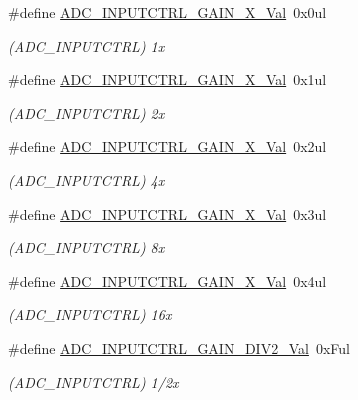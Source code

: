 \begin{DoxyCompactItemize}
\item 
\#define \mbox{\hyperlink{group___s_a_m_d21___a_d_c_gae498c391fa8ac63d38569d002826605a}{A\+D\+C\+\_\+\+I\+N\+P\+U\+T\+C\+T\+R\+L\+\_\+\+G\+A\+I\+N\+\_\+X\+\_\+\+Val}}~0x0ul
\begin{DoxyCompactList}\small\item\em (A\+D\+C\+\_\+\+I\+N\+P\+U\+T\+C\+T\+RL) 1x \end{DoxyCompactList}\item 
\#define \mbox{\hyperlink{group___s_a_m_d21___a_d_c_gacc42108cc0e40f605bd1b3454c9508d4}{A\+D\+C\+\_\+\+I\+N\+P\+U\+T\+C\+T\+R\+L\+\_\+\+G\+A\+I\+N\+\_\+X\+\_\+\+Val}}~0x1ul
\begin{DoxyCompactList}\small\item\em (A\+D\+C\+\_\+\+I\+N\+P\+U\+T\+C\+T\+RL) 2x \end{DoxyCompactList}\item 
\#define \mbox{\hyperlink{group___s_a_m_d21___a_d_c_ga1f880c59128e102862d2e5d67a354be2}{A\+D\+C\+\_\+\+I\+N\+P\+U\+T\+C\+T\+R\+L\+\_\+\+G\+A\+I\+N\+\_\+X\+\_\+\+Val}}~0x2ul
\begin{DoxyCompactList}\small\item\em (A\+D\+C\+\_\+\+I\+N\+P\+U\+T\+C\+T\+RL) 4x \end{DoxyCompactList}\item 
\#define \mbox{\hyperlink{group___s_a_m_d21___a_d_c_ga947e4391fff8d438b3388a77858ad0ad}{A\+D\+C\+\_\+\+I\+N\+P\+U\+T\+C\+T\+R\+L\+\_\+\+G\+A\+I\+N\+\_\+X\+\_\+\+Val}}~0x3ul
\begin{DoxyCompactList}\small\item\em (A\+D\+C\+\_\+\+I\+N\+P\+U\+T\+C\+T\+RL) 8x \end{DoxyCompactList}\item 
\#define \mbox{\hyperlink{group___s_a_m_d21___a_d_c_gac1ed865d00b174a99fe28a0697de2dff}{A\+D\+C\+\_\+\+I\+N\+P\+U\+T\+C\+T\+R\+L\+\_\+\+G\+A\+I\+N\+\_\+X\+\_\+\+Val}}~0x4ul
\begin{DoxyCompactList}\small\item\em (A\+D\+C\+\_\+\+I\+N\+P\+U\+T\+C\+T\+RL) 16x \end{DoxyCompactList}\item 
\#define \mbox{\hyperlink{group___s_a_m_d21___a_d_c_ga273e75b1c77da9d8ed6efc363748c333}{A\+D\+C\+\_\+\+I\+N\+P\+U\+T\+C\+T\+R\+L\+\_\+\+G\+A\+I\+N\+\_\+\+D\+I\+V2\+\_\+\+Val}}~0x\+Ful
\begin{DoxyCompactList}\small\item\em (A\+D\+C\+\_\+\+I\+N\+P\+U\+T\+C\+T\+RL) 1/2x \end{DoxyCompactList}\item 

\end{DoxyCompactItemize}
